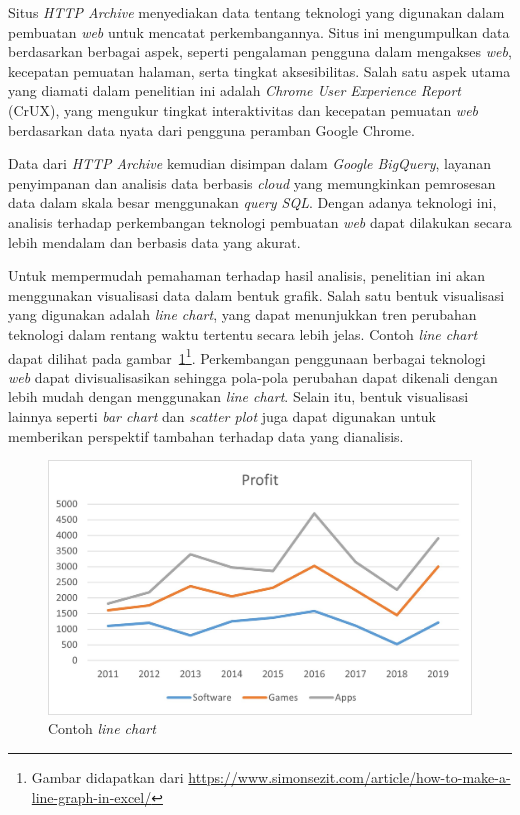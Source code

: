 \documentclass[a4paper,twoside]{article}
\newcommand{\web}{\textit{web}\xspace}
\begin{document}
Situs \textit{HTTP Archive} menyediakan data tentang teknologi yang digunakan dalam pembuatan \web untuk mencatat perkembangannya. Situs ini mengumpulkan data berdasarkan berbagai aspek, seperti pengalaman pengguna dalam mengakses \web, kecepatan pemuatan halaman, serta tingkat aksesibilitas. Salah satu aspek utama yang diamati dalam penelitian ini adalah \textit{Chrome User Experience Report} (CrUX), yang mengukur tingkat interaktivitas dan kecepatan pemuatan \web berdasarkan data nyata dari pengguna peramban Google Chrome.

Data dari \textit{HTTP Archive} kemudian disimpan dalam \textit{Google BigQuery}, layanan penyimpanan dan analisis data berbasis \textit{cloud} yang memungkinkan pemrosesan data dalam skala besar menggunakan \textit{query SQL}. Dengan adanya teknologi ini, analisis terhadap perkembangan teknologi pembuatan \web dapat dilakukan secara lebih mendalam dan berbasis data yang akurat.

Untuk mempermudah pemahaman terhadap hasil analisis, penelitian ini akan menggunakan visualisasi data dalam bentuk grafik. Salah satu bentuk visualisasi yang digunakan adalah \textit{line chart}, yang dapat menunjukkan tren perubahan teknologi dalam rentang waktu tertentu secara lebih jelas. Contoh \textit{line chart} dapat dilihat pada gambar~\ref{fig:contohlinechart}\footnote{Gambar didapatkan dari \url{https://www.simonsezit.com/article/how-to-make-a-line-graph-in-excel/}}. Perkembangan penggunaan berbagai teknologi \web dapat divisualisasikan sehingga pola-pola perubahan dapat dikenali dengan lebih mudah dengan menggunakan \textit{line chart}. Selain itu, bentuk visualisasi lainnya seperti \textit{bar chart} dan \textit{scatter plot} juga dapat digunakan untuk memberikan perspektif tambahan terhadap data yang dianalisis.

\begin{figure}[]
        \centering
        \includegraphics[width=0.5\linewidth]{Gambar/contoh linechart.jpg}
        \caption{Contoh \textit{line chart}}
        \label{fig:contohlinechart}
    \end{figure}
\end{document}
